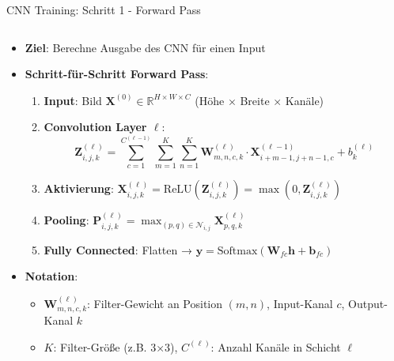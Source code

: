 \documentclass[aspectratio=1610, xcolor=dvipsnames, 9pt]{beamer}
\begin{document}
      \begin{frame}{CNN Training: Schritt 1 - Forward Pass}
        \begin{columns}
          \begin{column}{1\textwidth}
            \begin{itemize}
              \item \textbf{Ziel}: Berechne Ausgabe des CNN für einen Input
              \item \textbf{Schritt-für-Schritt Forward Pass}:
              \begin{enumerate}
                \item \textbf{Input}: Bild $\mathbf{X}^{(0)} \in \mathbb{R}^{H \times W \times C}$ (Höhe × Breite × Kanäle)
                \item \textbf{Convolution Layer $\ell$}:
                \begin{equation}
                  \mathbf{Z}^{(\ell)}_{i,j,k} = \sum_{c=1}^{C^{(\ell-1)}} \sum_{m=1}^{K} \sum_{n=1}^{K} \mathbf{W}^{(\ell)}_{m,n,c,k} \cdot \mathbf{X}^{(\ell-1)}_{i+m-1,j+n-1,c} + b^{(\ell)}_k
                \end{equation}
                \item \textbf{Aktivierung}: $\mathbf{X}^{(\ell)}_{i,j,k} = \text{ReLU}(\mathbf{Z}^{(\ell)}_{i,j,k}) = \max(0, \mathbf{Z}^{(\ell)}_{i,j,k})$
                \item \textbf{Pooling}: $\mathbf{P}^{(\ell)}_{i,j,k} = \max_{(p,q) \in \mathcal{N}_{i,j}} \mathbf{X}^{(\ell)}_{p,q,k}$
                \item \textbf{Fully Connected}: Flatten → $\mathbf{y} = \text{Softmax}(\mathbf{W}_{fc} \mathbf{h} + \mathbf{b}_{fc})$
              \end{enumerate}
              \item \textbf{Notation}:
              \begin{itemize}
                \item $\mathbf{W}^{(\ell)}_{m,n,c,k}$: Filter-Gewicht an Position $(m,n)$, Input-Kanal $c$, Output-Kanal $k$
                \item $K$: Filter-Größe (z.B. 3×3), $C^{(\ell)}$: Anzahl Kanäle in Schicht $\ell$
              \end{itemize}
            \end{itemize}
          \end{column}
        \end{columns}
      \end{frame}
\end{document}
